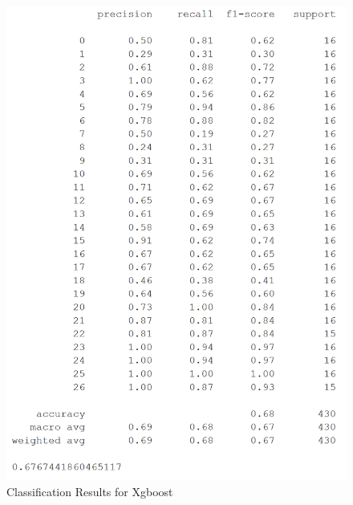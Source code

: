 \documentclass[conference]{IEEEtran}
\begin{document}
\begin{figure}[H]
\begin{center}
\includegraphics[scale=0.55]{Image/xgb_27_class_report.png}
\caption{\label{xgb_27_class_report} Classification Results for Xgboost}
\end{center}
\end{figure}
\end{document}
